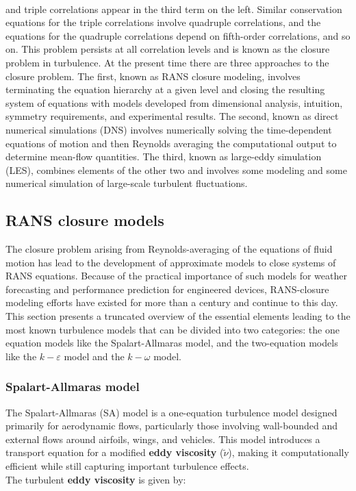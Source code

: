 \documentclass[a5paper]{sapthesis}
\begin{document}
	\\
	and triple correlations appear in the third term on the left. Similar conservation equations for the triple correlations involve quadruple correlations, and the equations for the quadruple correlations depend on fifth-order correlations, and so on. This problem persists at all correlation levels and is known as the closure problem in turbulence. At the present time there are three approaches to the closure problem. The first, known as RANS closure
	modeling, involves terminating the equation hierarchy at a given level and closing the resulting system of equations with models developed from dimensional analysis, 	intuition, symmetry requirements, and experimental results. The second, known as direct numerical simulations (DNS) involves numerically solving the time-dependent equations of motion and
	then Reynolds averaging the computational output to determine mean-flow quantities. The third, known as large-eddy simulation (LES), combines elements of the other two and involves some modeling and some numerical simulation of large-scale turbulent fluctuations.
	
	\subsection{RANS closure models}
	The closure problem arising from Reynolds-averaging of the equations of fluid motion has lead to the development of approximate models to close systems of RANS equations. Because
	of the practical importance of such models for weather forecasting and performance prediction for engineered devices, RANS-closure modeling efforts have existed for more than a century and continue to this day. This section presents a truncated overview of the essential elements leading to the most known turbulence models that can be divided into two categories: the one equation models like the Spalart-Allmaras model, and the two-equation models like the $k-\varepsilon$ model and the $k-\omega$ model.
	
	\subsubsection{Spalart-Allmaras model}
	The Spalart-Allmaras (SA) model is a one-equation turbulence model\cite{SPALARTALLMARAS} designed primarily for aerodynamic flows, particularly those involving wall-bounded and external flows around airfoils, wings, and vehicles. This model introduces a transport equation for a modified \textbf{eddy viscosity} ($\tilde{\nu}$), making it computationally efficient while still capturing important turbulence effects. \\
	The turbulent \textbf{eddy viscosity} is given by:
	
\end{document}
